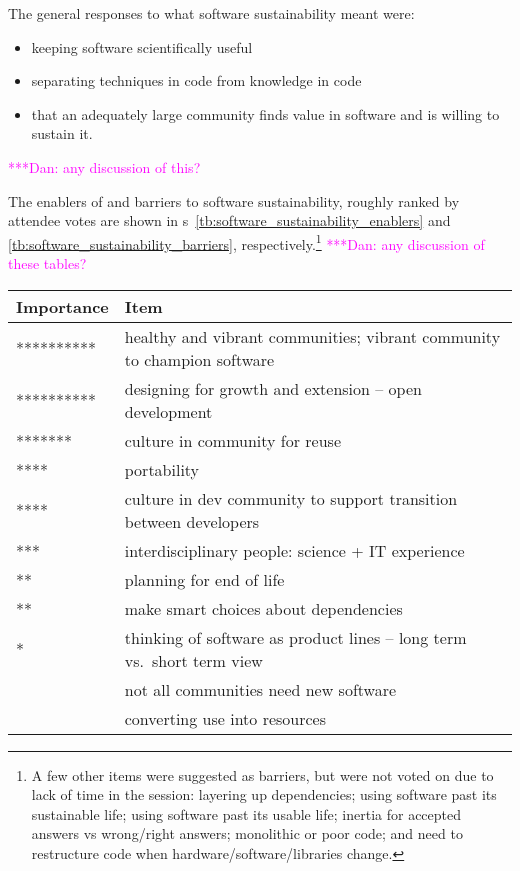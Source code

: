 \documentclass[11pt, oneside]{amsart}
\newcommand{\katznote}[1]{ {\textcolor{magenta}    { ***Dan:      #1 }}}
\begin{document}
The general responses to what software sustainability meant were:
\begin{itemize}
\item keeping software scientifically useful
\item separating techniques in code from knowledge in code
\item that an adequately large community finds value in software and is willing
to sustain it.
\end{itemize}
\katznote{any discussion of this?}

The enablers of and barriers to software sustainability, roughly ranked by
attendee votes are shown in
{\tablename}s~\ref{tb:software_sustainability_enablers} and
\ref{tb:software_sustainability_barriers}, respectively.\footnote{A few other
items were suggested as barriers, but were not voted on due to lack of time in
the session:
layering up dependencies;
using software past its sustainable life;
using software past its usable life;
inertia for accepted answers vs wrong/right answers;
monolithic or poor code; and
need to restructure code when hardware/software/libraries change.
}
\katznote{any discussion of these tables?}

\begin{table*}[ht]
 \centering
\caption{Enablers of software sustainability, with 0 to 10 `*'s roughly
indicating the fraction of attendees who voted for an item as important.}
\label{tb:software_sustainability_enablers}
  \begin{scriptsize}
  \begin{tabular}{ | p{1.65cm} | p{10.0cm} |}
    \hline
  Importance & Item \\ \hline \hline
********** & healthy and vibrant communities; vibrant community to champion software \\ \hline
********** & designing for growth and extension -- open development \\ \hline
******* & culture in community for reuse \\ \hline
**** & portability \\ \hline
**** & culture in dev community to support transition between developers \\ \hline
*** & interdisciplinary people: science + IT experience \\ \hline
** & planning for end of life \\ \hline
** & make smart choices about dependencies \\ \hline
* & thinking of software as product lines -- long term vs.~short term view \\ \hline
 & not all communities need new software \\ \hline
 & converting use into resources \\ \hline
    \end{tabular}
    \end{scriptsize}
\end{table*} 
\end{document}
